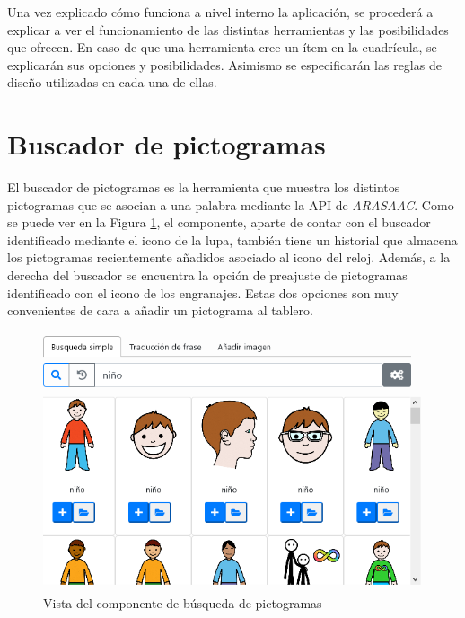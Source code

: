 Una vez explicado cómo funciona a nivel interno la aplicación, se procederá a explicar a ver el funcionamiento de las distintas herramientas y las posibilidades que ofrecen. En caso de que una herramienta cree un ítem en la cuadrícula, se explicarán sus opciones y posibilidades. Asimismo se especificarán las reglas de diseño utilizadas en cada una de ellas.





\section{Buscador de pictogramas}
\label{cap5:buscador}
El buscador de pictogramas es la herramienta que muestra los distintos pictogramas que se asocian a una palabra mediante la API de \textit{ARASAAC}. Como se puede ver en la Figura \ref{fig:buscarpicto2}, el componente, aparte de contar con el buscador identificado mediante el icono de la lupa, también tiene un historial que almacena los pictogramas recientemente añadidos asociado al icono del reloj. Además, a la derecha del buscador se encuentra la opción de preajuste de pictogramas identificado con el icono de los engranajes. Estas dos opciones son muy convenientes de cara a añadir un pictograma al tablero. 


\begin{figure}[h!]
	\centering
	\includegraphics[width=0.7\linewidth]{Imagenes/Bitmap/buscarPicto2}
	\caption{Vista del componente de búsqueda de pictogramas}
	\label{fig:buscarpicto2}
\end{figure}


